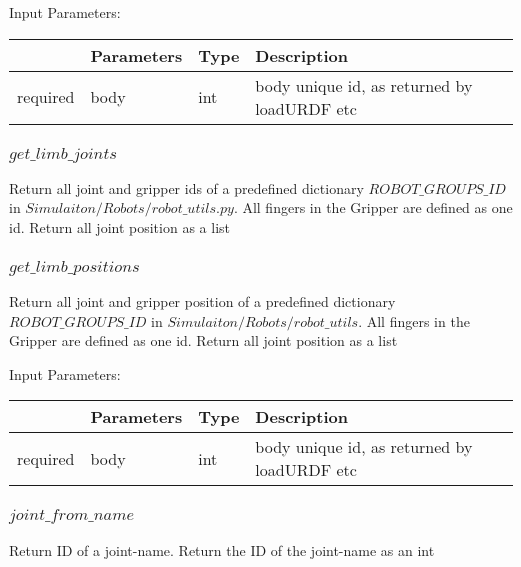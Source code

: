 \documentclass[
	ngerman,
	accentcolor=9c,%
	type=intern,
	marginpar=false
	]{tudapub}
\begin{document}
\vspace{0.5cm}
\noindent Input Parameters:
\vspace{0.5cm}

\begin{tabular}{|p{}|p{}|p{}| p{}|}
\hline
 & \textbf{Parameters} & \textbf{Type} & \textbf{Description} \\
\hline
required & body & int & body unique id, as returned by loadURDF etc\\
\hline

\end{tabular}
\vspace{0.5cm}


\subsubsection{$get\_limb\_joints$}
\noindent Return all joint and gripper ids of a predefined dictionary $ROBOT\_GROUPS\_ID$ in $Simulaiton/Robots/robot\_utils.py$.  All fingers in the Gripper are defined as one id. Return all joint position as a list

\vspace{0.5cm}



\subsubsection{$get\_limb\_positions$}
\noindent Return all joint and gripper position of a predefined dictionary $ROBOT\_GROUPS\_ID$ in $Simulaiton/Robots/robot\_utils$. All fingers in the Gripper are defined as one id. Return all joint position as a list

\vspace{0.5cm}
\noindent Input Parameters:
\vspace{0.5cm}

\begin{tabular}{|p{}|p{}|p{}| p{}|}
\hline
 & \textbf{Parameters} & \textbf{Type} & \textbf{Description} \\
\hline
required & body & int & body unique id, as returned by loadURDF etc\\
\hline

\end{tabular}
\vspace{0.5cm}




\subsubsection{$joint\_from\_name$}
\noindent Return ID of a joint-name. Return the ID of the joint-name as an int
\end{document}
